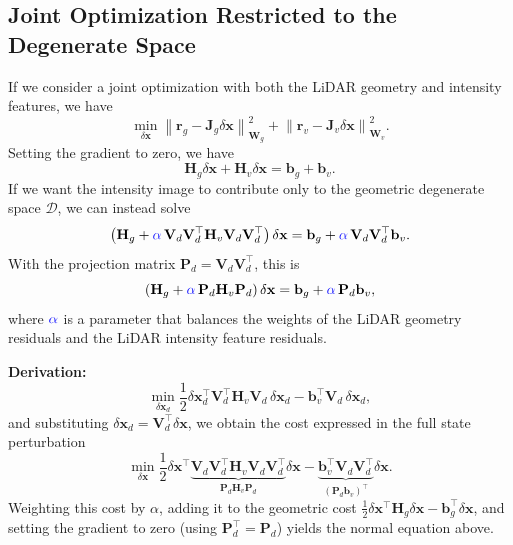 \subsection{Joint Optimization Restricted to the Degenerate Space}
If we consider a joint optimization with both the LiDAR geometry and intensity features, we have
\begin{equation}
    \min_{\delta\mathbf{x}} \left\|\mathbf{r}_g - \mathbf{J}_g\delta\mathbf{x}\right\|_{\mathbf{W}_g}^2 + \left\|\mathbf{r}_v - \mathbf{J}_v\delta\mathbf{x}\right\|_{\mathbf{W}_v}^2.
\end{equation}
Setting the gradient to zero, we have
\begin{equation}
    \mathbf{H}_g\delta\mathbf{x} + \mathbf{H}_v\delta\mathbf{x} = \mathbf{b}_g + \mathbf{b}_v.
\end{equation}
If we want the intensity image to contribute only to the geometric degenerate space $\mathcal{D}$, we can instead solve
\begin{equation}
    \label{eq:joint_ls}
    \left(\mathbf{H}_g + \textcolor{blue}{\alpha}\,\mathbf{V}_d\mathbf{V}_d^{\top}\mathbf{H}_v\mathbf{V}_d\mathbf{V}_d^{\top}\right)\delta\mathbf{x} = \mathbf{b}_g + \textcolor{blue}{\alpha}\,\mathbf{V}_d\mathbf{V}_d^{\top}\mathbf{b}_v.
\end{equation}
With the projection matrix $\mathbf{P}_d = \mathbf{V}_d\mathbf{V}_d^{\top}$, this is
\begin{equation}
    \label{eq:joint_ls_simple}
    \left(\mathbf{H}_g + \textcolor{blue}{\alpha}\,\mathbf{P}_d\mathbf{H}_v\mathbf{P}_d\right)\delta\mathbf{x} = \mathbf{b}_g + \textcolor{blue}{\alpha}\,\mathbf{P}_d\mathbf{b}_v,
\end{equation}
where $\textcolor{blue}{\alpha}$ is a parameter that balances the weights of the LiDAR geometry residuals and the LiDAR intensity feature residuals.

\textbf{Derivation:} 
\begin{equation}
    \min_{\delta\mathbf{x}_d} \frac{1}{2}\delta\mathbf{x}_d^{\top}\mathbf{V}_d^{\top}\mathbf{H}_v\mathbf{V}_d\,\delta\mathbf{x}_d - \mathbf{b}_v^{\top}\mathbf{V}_d\,\delta\mathbf{x}_d,
\end{equation}
and substituting $\delta\mathbf{x}_d = \mathbf{V}_d^{\top}\delta\mathbf{x}$, we obtain the cost expressed in the full state perturbation
\begin{equation}
    \min_{\delta\mathbf{x}} \frac{1}{2}\delta\mathbf{x}^{\top}\underbrace{\mathbf{V}_d\mathbf{V}_d^{\top}\mathbf{H}_v\mathbf{V}_d\mathbf{V}_d^{\top}}_{\mathbf{P}_d\mathbf{H}_v\mathbf{P}_d}\delta\mathbf{x} - \underbrace{\mathbf{b}_v^{\top}\mathbf{V}_d\mathbf{V}_d^{\top}}_{(\mathbf{P}_d\mathbf{b}_v)^{\top}}\delta\mathbf{x}.
\end{equation}
Weighting this cost by $\alpha$, adding it to the geometric cost $\frac{1}{2}\delta\mathbf{x}^{\top}\mathbf{H}_g\delta\mathbf{x} - \mathbf{b}_g^{\top}\delta\mathbf{x}$, and setting the gradient to zero (using $\mathbf{P}_d^{\top} = \mathbf{P}_d$) yields the normal equation above.


